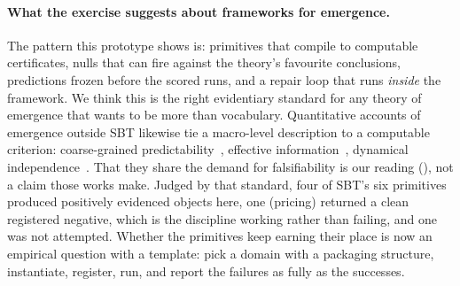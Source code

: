 \paragraph{What the exercise suggests about frameworks for emergence.} The pattern this prototype shows is: primitives that compile to computable certificates, nulls that can fire against the theory's favourite conclusions, predictions frozen before the scored runs, and a repair loop that runs \emph{inside} the framework. We think this is the right evidentiary standard for any theory of emergence that wants to be more than vocabulary. Quantitative accounts of emergence outside SBT likewise tie a macro-level description to a computable criterion: coarse-grained predictability~\cite{israeli2006coarse}, effective information~\cite{hoel2013causal}, dynamical independence~\cite{barnett2023dynamical}. That they share the demand for falsifiability is our reading (\gInterp), not a claim those works make. Judged by that standard, four of SBT's six primitives produced positively evidenced objects here, one (pricing) returned a clean registered negative, which is the discipline working rather than failing, and one was not attempted. Whether the primitives keep earning their place is now an empirical question with a template: pick a domain with a packaging structure, instantiate, register, run, and report the failures as fully as the successes.
